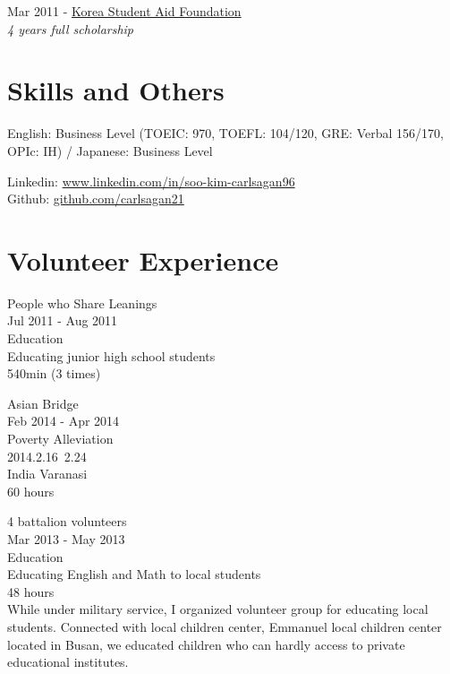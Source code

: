 \documentclass[10pt]{article} %
\begin{document}
{
Mar 2011 - \href{http://eng.kosaf.go.kr/jsp/main.jsp}{Korea Student Aid Foundation}\\
\textit{4 years full scholarship}
}
\fi


\section{Skills and Others}

{
English: Business Level (TOEIC: 970, TOEFL: 104/120, GRE: Verbal 156/170, OPIc: IH) / Japanese: Business Level
}

{
Linkedin: \href{https://www.linkedin.com/in/soo-kim-carlsagan96}{www.linkedin.com/in/soo-kim-carlsagan96}\\
Github: \href{https://github.com/carlsagan21}{github.com/carlsagan21}
}


\if{}
\section{Volunteer Experience}

{
People who Share Leanings\\
Jul 2011 - Aug 2011\\
Education\\
Educating junior high school students\\
540min (3 times)
}


{
Asian Bridge\\
Feb 2014 - Apr 2014\\
Poverty Alleviation\\
2014.2.16~2.24\\
India Varanasi\\
60 hours
}

{
4 battalion volunteers\\
Mar 2013 - May 2013\\
Education\\
Educating English and Math to local students\\
48 hours\\
While under military service, I organized volunteer group for educating local students. Connected with local children center, Emmanuel local children center located in Busan, we educated children who can hardly access to private educational institutes.
}
\fi
\end{document}
